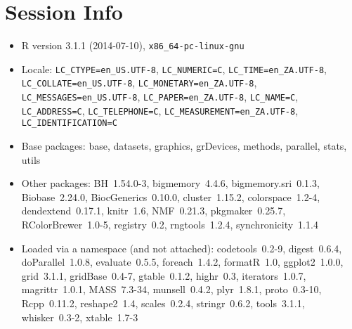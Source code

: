 \documentclass[a4paper]{article}\usepackage[]{graphicx}\usepackage[]{color}
\begin{document}
\section{Session Info}
\begin{itemize}\raggedright
  \item R version 3.1.1 (2014-07-10), \verb|x86_64-pc-linux-gnu|
  \item Locale: \verb|LC_CTYPE=en_US.UTF-8|, \verb|LC_NUMERIC=C|, \verb|LC_TIME=en_ZA.UTF-8|, \verb|LC_COLLATE=en_US.UTF-8|, \verb|LC_MONETARY=en_ZA.UTF-8|, \verb|LC_MESSAGES=en_US.UTF-8|, \verb|LC_PAPER=en_ZA.UTF-8|, \verb|LC_NAME=C|, \verb|LC_ADDRESS=C|, \verb|LC_TELEPHONE=C|, \verb|LC_MEASUREMENT=en_ZA.UTF-8|, \verb|LC_IDENTIFICATION=C|
  \item Base packages: base, datasets, graphics, grDevices,
    methods, parallel, stats, utils
  \item Other packages: BH~1.54.0-3, bigmemory~4.4.6,
    bigmemory.sri~0.1.3, Biobase~2.24.0, BiocGenerics~0.10.0,
    cluster~1.15.2, colorspace~1.2-4, dendextend~0.17.1,
    knitr~1.6, NMF~0.21.3, pkgmaker~0.25.7, RColorBrewer~1.0-5,
    registry~0.2, rngtools~1.2.4, synchronicity~1.1.4
  \item Loaded via a namespace (and not attached):
    codetools~0.2-9, digest~0.6.4, doParallel~1.0.8,
    evaluate~0.5.5, foreach~1.4.2, formatR~1.0, ggplot2~1.0.0,
    grid~3.1.1, gridBase~0.4-7, gtable~0.1.2, highr~0.3,
    iterators~1.0.7, magrittr~1.0.1, MASS~7.3-34, munsell~0.4.2,
    plyr~1.8.1, proto~0.3-10, Rcpp~0.11.2, reshape2~1.4,
    scales~0.2.4, stringr~0.6.2, tools~3.1.1, whisker~0.3-2,
    xtable~1.7-3
\end{itemize}


\printbibliography[heading=bibintoc]
\end{document}

